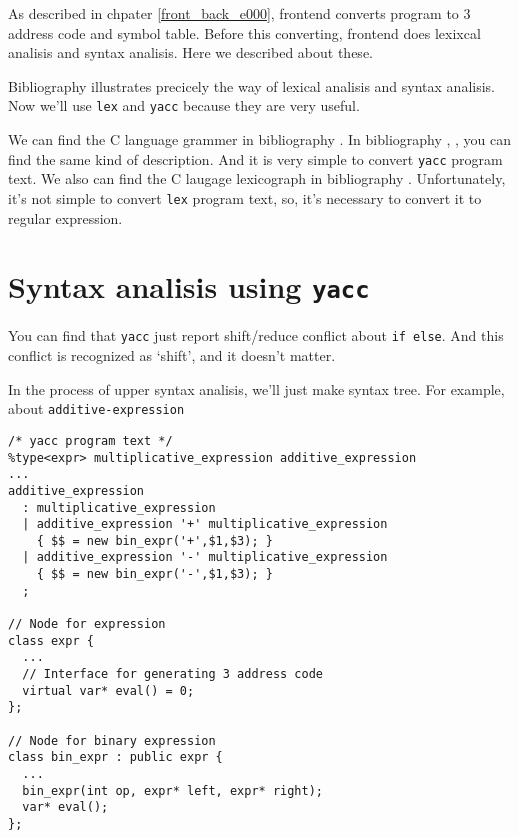 \label{lex_yacc_e000}
As described in chpater \ref{front_back_e000}, frontend
converts program to 3 address code and symbol table.
Before this converting, frontend does lexixcal analisis
and syntax analisis. Here we described about these.

Bibliography \cite{doragon} illustrates precicely
the way of lexical analisis and syntax analisis.
Now we'll use {\tt{lex}} and {\tt{yacc}} because
they are very useful.

We can find the C language grammer in bibliography \cite{ISO}.
In bibliography \cite{KR}, \cite{SGS}, you can find 
the same kind of description.
And it is very simple to convert {\tt{yacc}} program text.
We also can find the C laugage lexicograph in bibliography \cite{ISO}.
Unfortunately, it's not simple to convert {\tt{lex}} program text, so,
it's necessary to convert it to regular expression.

\section{Syntax analisis using {\tt{yacc}} }

\label{lex_yacc_e003}
You can find that {\tt{yacc}} just report shift/reduce conflict about
{\tt{if else}}. And this conflict is recognized as `shift', and it doesn't
matter.

In the process of upper syntax analisis, we'll just make
syntax tree. For example, about {\tt{additive-expression}}

\begin{verbatim}
/* yacc program text */
%type<expr> multiplicative_expression additive_expression
...
additive_expression
  : multiplicative_expression
  | additive_expression '+' multiplicative_expression
    { $$ = new bin_expr('+',$1,$3); }
  | additive_expression '-' multiplicative_expression
    { $$ = new bin_expr('-',$1,$3); }
  ;

// Node for expression
class expr {
  ...
  // Interface for generating 3 address code
  virtual var* eval() = 0;
};

// Node for binary expression
class bin_expr : public expr {
  ...
  bin_expr(int op, expr* left, expr* right);
  var* eval();
};
\end{verbatim}

